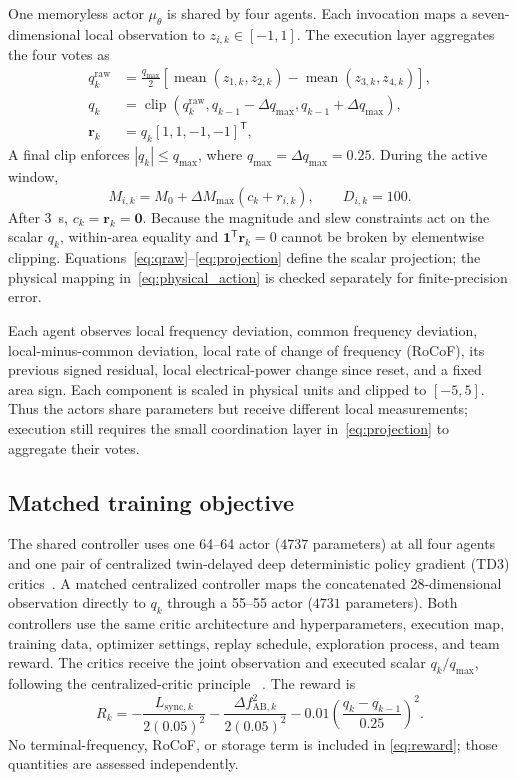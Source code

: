 \documentclass[conference,a4paper]{IEEEtran}
\begin{document}
One memoryless actor \(\mu_\theta\) is shared by four agents. Each invocation
maps a seven-dimensional local observation to
\(z_{i,k}\in[-1,1]\). The execution layer aggregates the four votes as
\begin{align}
 q^{\mathrm{raw}}_k
 &=\frac{q_{\max}}{2}
 \left[\operatorname{mean}(z_{1,k},z_{2,k})
 -\operatorname{mean}(z_{3,k},z_{4,k})\right],\label{eq:qraw}\\
 q_k&=\operatorname{clip}\!\left(q^{\mathrm{raw}}_k,
 q_{k-1}-\Delta q_{\max},q_{k-1}+\Delta q_{\max}\right),
 \label{eq:qclip}\\
 \mathbf r_k&=q_k[1,1,-1,-1]^\mathsf T ,
\label{eq:projection}
\end{align}
A final clip enforces \(|q_k|\le q_{\max}\), where
\(q_{\max}=\Delta q_{\max}=0.25\). During the active window,
\begin{equation}
 M_{i,k}=M_0+\Delta M_{\max}(c_k+r_{i,k}),\qquad D_{i,k}=100 .
\label{eq:physical_action}
\end{equation}
After \SI{3}{s}, \(c_k=\mathbf r_k=\mathbf0\). Because the magnitude and slew
constraints act on the scalar \(q_k\), within-area equality and
\(\mathbf1^\mathsf T\mathbf r_k=0\) cannot be broken by elementwise clipping.
Equations~\eqref{eq:qraw}--\eqref{eq:projection} define the scalar projection;
the physical mapping in~\eqref{eq:physical_action} is checked separately for
finite-precision error.

Each agent observes local frequency deviation, common frequency deviation,
local-minus-common deviation, local rate of change of frequency (RoCoF), its
previous signed residual, local electrical-power change since reset, and a
fixed area sign. Each component is scaled in physical units and clipped to
\([-5,5]\). Thus the actors share
parameters but receive different local measurements; execution still requires
the small coordination layer in~\eqref{eq:projection} to aggregate their
votes.

\subsection{Matched training objective}

The shared controller uses one 64--64 actor (\(4737\) parameters) at all four
agents and one pair of centralized twin-delayed deep deterministic
policy gradient (TD3) critics~\cite{fujimoto2018td3}. A
matched centralized controller maps the concatenated 28-dimensional
observation directly to \(q_k\) through a 55--55 actor (\(4731\) parameters).
Both controllers use the same critic architecture and hyperparameters,
execution map, training data, optimizer settings, replay schedule, exploration
process, and team reward. The critics receive the joint observation and
executed scalar \(q_k/q_{\max}\), following the centralized-critic principle
~\cite{lowe2017maddpg}. The reward is
\begin{equation}
 R_k=-\frac{L_{\mathrm{sync},k}}{2(0.05)^2}
 -\frac{\Delta f_{\mathrm{AB},k}^2}{2(0.05)^2}
 -0.01\left(\frac{q_k-q_{k-1}}{0.25}\right)^2 .
\label{eq:reward}
\end{equation}
No terminal-frequency, RoCoF, or storage term is included in
\eqref{eq:reward}; those quantities are assessed independently.
\end{document}
